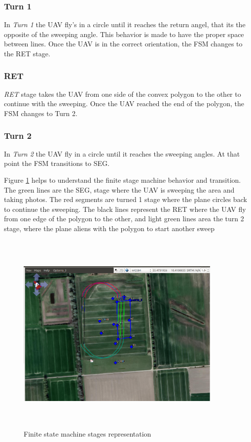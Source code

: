\subsubsection{Turn 1}
In \textit{Turn 1} the UAV fly's in a circle until it reaches the return angel, that its the opposite of the sweeping angle. This behavior is made to have the proper space between lines. Once the UAV is in the correct orientation, the FSM changes to the RET stage.
\subsubsection{RET}
\textit{RET} stage takes the UAV from one side of the convex polygon to the other to continue with the sweeping. Once the UAV reached the end of the polygon, the FSM changes to Turn 2.
\subsubsection{Turn 2}
In \textit{Turn 2} the UAV fly in a circle until it reaches the sweeping angles. At that point the FSM transitions to SEG.

Figure \ref{fig:FSM_example} helps to understand the finite stage machine behavior and transition.  The green lines are the SEG, stage where the UAV is sweeping the area and taking photos.  The red segments are turned 1 stage where the plane circles back to continue the sweeping. The black lines represent the RET where the UAV fly from one edge of the polygon to the other, and light green lines area the turn 2 stage, where the plane aliens with the polygon to start another sweep 
\begin{figure}[H]
\centering
\includegraphics[width=10cm,height=10cm,keepaspectratio]{imagenes/FSM_example.png}
\caption{Finite state machine stages representation}
\label{fig:FSM_example}
\end{figure}

